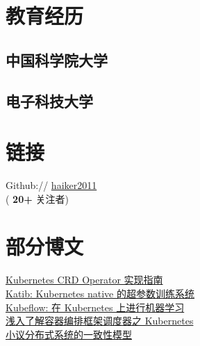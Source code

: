 \documentclass[]{deedy-resume-openfont}
\begin{document}
%
%
\lastupdated

%
%

%
%

\begin{minipage}[t]{0.3\textwidth} 


\section{教育经历} 
\sectionsep

\subsection{中国科学院大学}
\sectionsep

\subsection{电子科技大学}
\sectionsep


\section{链接}
\sectionsep    
Github:// \href{https://github.com/haiker2011}{haiker2011} \\
{(\textbf{ 20+ }关注者)} \\

\section{部分博文}
\sectionsep
\href{http://gaocegege.com/Blog/kubernetes/operator}{Kubernetes CRD Operator 实现指南} \\
\href{http://gaocegege.com/Blog/%E6%9C%BA%E5%99%A8%E5%AD%A6%E4%B9%A0/katib}{Katib: Kubernetes native 的超参数训练系统} \\
\href{http://gaocegege.com/Blog/ml%20system/kubeflow}{Kubeflow: 在 Kubernetes 上进行机器学习} \\
\href{http://gaocegege.com/Blog/%E6%BA%90%E7%A0%81%E5%88%86%E6%9E%90/kubernetes-scheduler}{浅入了解容器编排框架调度器之 Kubernetes} \\
\href{http://gaocegege.com/Blog/%E9%9A%8F%E7%AC%94/consistency}{小议分布式系统的一致性模型} \\
\sectionsep


\end{minipage}
\end{document}
